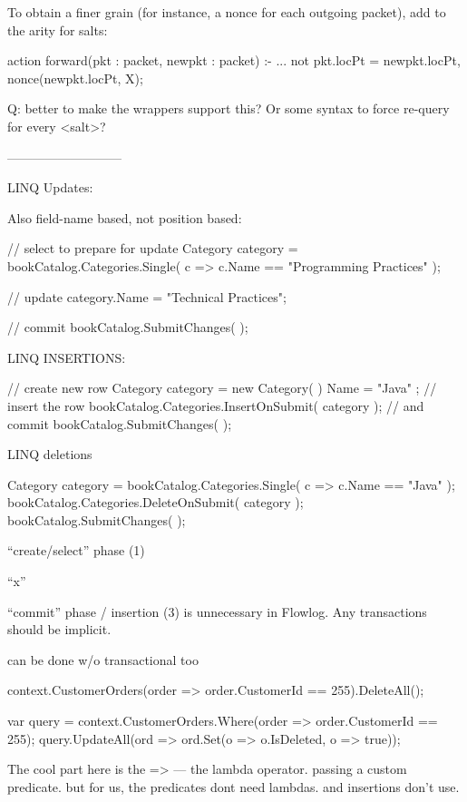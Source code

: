 To obtain a finer grain (for instance, a nonce for each outgoing
packet), add to the arity for salts:

\begin{flowlog}
action forward(pkt : packet, newpkt : packet) :-
  ...
  not pkt.locPt = newpkt.locPt,
  nonce(newpkt.locPt, X);
\end{flowlog}

Q: better to make the wrappers support this? Or some syntax to force
re-query for every <salt>?



---------------------------

LINQ Updates:

Also field-name based, not position based:

// select to prepare for update
Category category = 
  bookCatalog.Categories.Single( c => c.Name == "Programming Practices" );

// update
category.Name = "Technical Practices";

// commit
bookCatalog.SubmitChanges( );


LINQ INSERTIONS:

// create new row
Category category = new Category( ) { Name = "Java" };
// insert the row
bookCatalog.Categories.InsertOnSubmit( category );
// and commit
bookCatalog.SubmitChanges( );

LINQ deletions

Category category = bookCatalog.Categories.Single( c => c.Name == "Java" );
bookCatalog.Categories.DeleteOnSubmit( category );
bookCatalog.SubmitChanges( );


``create/select'' phase (1)

``x''

``commit'' phase / insertion (3) is unnecessary in Flowlog. Any transactions should be implicit.


can be done w/o transactional too

context.CustomerOrders(order => order.CustomerId == 255).DeleteAll();

var query = context.CustomerOrders.Where(order => order.CustomerId == 255);
query.UpdateAll(ord => ord.Set(o => o.IsDeleted, o => true));

The cool part here is the => --- the lambda operator.
passing a custom predicate. but for us, the predicates dont need lambdas. and insertions don't use. 







